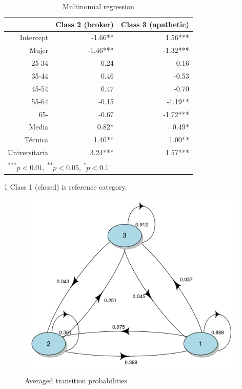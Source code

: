 \begin{table}[htp]
\centering
\begin{threeparttable}
\caption{\label{demo-table} Multinomial regression}
\begin{tabular}{rrr}
  \hline
 & Class 2 (broker) & Class 3 (apathetic)\\ 
  \hline
Intercept & -1.66** & 1.56*** \\ 
  Mujer & -1.46*** & -1.32*** \\ 
  25-34 & 0.24 & -0.16 \\ 
  35-44 & 0.46 & -0.53 \\ 
  45-54 & 0.47 & -0.70 \\ 
  55-64 & -0.15 & -1.19** \\ 
  65- & -0.67 & -1.72*** \\ 
  Media & 0.82* & 0.49* \\ 
  Técnica & 1.40** & 1.00** \\ 
  Universitaria & 3.24*** & 1.57*** \\ 
   \hline
\multicolumn{3}{l}{\textsuperscript{***}$p<0.01$, 
  \textsuperscript{**}$p<0.05$, 
  \textsuperscript{*}$p<0.1$}
\end{tabular}
\begin{tablenotes}
    \item[1] Class 1 (closed) is reference category.
  \end{tablenotes}
\end{threeparttable}
\end{table}


\begin{figure}[htp]
    \centering
    \includegraphics[width=11cm]{output/plot_transition.png}
    \caption{Averaged transition probabilities}
        \label{fig:trans}
\end{figure}

